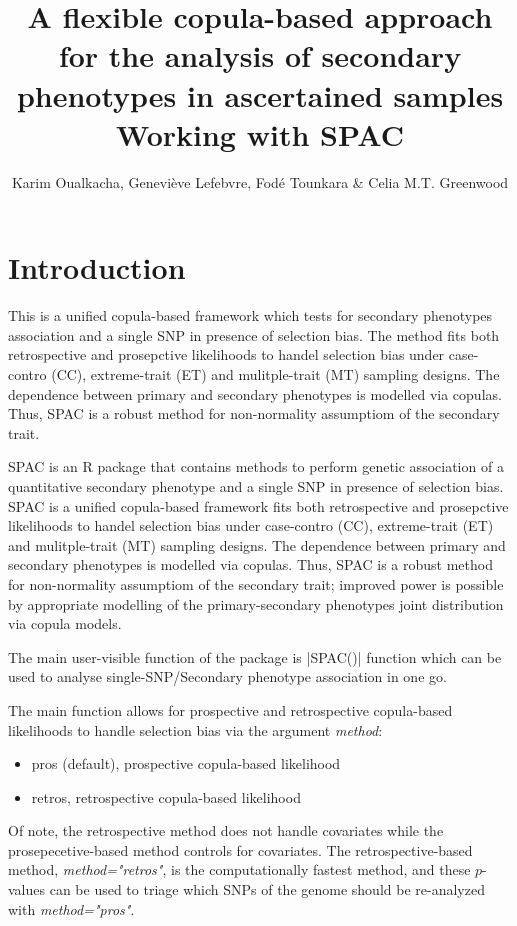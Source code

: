 \documentclass{article}\usepackage[]{graphicx}\usepackage[]{color}
\title{A flexible copula-based approach for the analysis of secondary phenotypes in ascertained samples\\ \vspace{.5cm}
Working with SPAC}
\author{Karim Oualkacha, Genevi\`eve Lefebvre, Fod\'e Tounkara \& Celia M.T. Greenwood}
\begin{document}
\maketitle
\tableofcontents

\section{Introduction}
\label{sec:introduction}

This is a unified copula-based framework which tests for secondary phenotypes association and a single SNP in presence of selection bias. The method fits both retrospective and prosepctive likelihoods to handel selection bias under case-contro (CC), extreme-trait (ET) and mulitple-trait (MT) sampling designs. The dependence between primary and secondary phenotypes is modelled via copulas. Thus, SPAC is a robust method for non-normality assumptiom of the secondary trait.

SPAC is an R package that contains methods to perform genetic association of a quantitative secondary phenotype and a single SNP in presence of selection bias. SPAC is a unified copula-based framework  fits both retrospective and prosepctive likelihoods to handel selection bias under case-contro (CC), extreme-trait (ET) and mulitple-trait (MT) sampling designs. The dependence between primary and secondary phenotypes is modelled via copulas. Thus, SPAC is a robust method for non-normality assumptiom of the secondary trait; improved power is possible by appropriate modelling of the primary-secondary phenotypes joint distribution via copula models.

The main user-visible function of the package is |SPAC()| function which can be used to
analyse single-SNP/Secondary phenotype association in one go.

The main function allows for prospective and retrospective copula-based likelihoods to handle selection bias via the argument \emph{method}:
  \begin{itemize}
  \item pros (default), prospective copula-based likelihood
  \item retros, retrospective copula-based likelihood
  \end{itemize}

Of note, the retrospective method does not handle covariates while the prosepecetive-based method controls for covariates. The retrospective-based method, \emph{method="retros"}, is the computationally fastest method, and these $p$-values can be used to triage which SNPs of the genome should be re-analyzed with \emph{method="pros"}.
\end{document}
